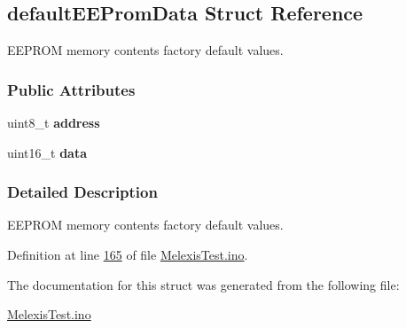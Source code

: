 \hypertarget{structdefault_e_e_prom_data}{}\subsection{default\+E\+E\+Prom\+Data Struct Reference}
\label{structdefault_e_e_prom_data}


E\+E\+P\+R\+OM memory contents factory default values.  


\subsubsection*{Public Attributes}
\begin{DoxyCompactItemize}
\item 
\mbox{\label{structdefault_e_e_prom_data_af1dad8ee7eace389e3dcecbedcd9af04}} 
uint8\+\_\+t {\bfseries address}
\item 
\mbox{\label{structdefault_e_e_prom_data_abb3e4be9656ea9b20f05a1288c09020a}} 
uint16\+\_\+t {\bfseries data}
\end{DoxyCompactItemize}


\subsubsection{Detailed Description}
E\+E\+P\+R\+OM memory contents factory default values. 

Definition at line \mbox{\hyperlink{_melexis_test_8ino_source_l00165}{165}} of file \mbox{\hyperlink{_melexis_test_8ino_source}{Melexis\+Test.\+ino}}.



The documentation for this struct was generated from the following file\+:\begin{DoxyCompactItemize}
\item 
\mbox{\hyperlink{_melexis_test_8ino}{Melexis\+Test.\+ino}}\end{DoxyCompactItemize}
